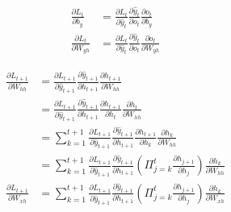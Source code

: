 \documentclass{beamer}
\begin{document}
\begin{frame}
    \begin{equation*}
        \begin{aligned}
            \frac{\partial L_t}{\partial b_y}
            &= \frac{\partial L_t}{\partial\hat{y}_t}\frac{\partial\hat{y}_t}{\partial o_t}\frac{\partial o_t}{\partial b_y} \\
            \frac{\partial L_t}{\partial W_{yh}}
            &= \frac{\partial L_t}{\partial\hat{y}_t}\frac{\partial\hat{y}_t}{\partial o_t}\frac{\partial o_t}{\partial W_{yh}}
        \end{aligned}
    \end{equation*}
\end{frame}

\begin{frame}
    \begin{equation*}
        \begin{aligned}
            \frac{\partial L_{t+1}}{\partial W_{hh}}
            &= \frac{\partial L_{t+1}}{\partial\hat{y}_{t+1}}\frac{\partial\hat{y}_{t+1}}{\partial h_{t+1}}\frac{\partial h_{t+1}}{\partial W_{hh}} \\
            &= \frac{\partial L_{t+1}}{\partial\hat{y}_{t+1}}\frac{\partial\hat{y}_{t+1}}{\partial h_{t+1}}\frac{\partial h_{t+1}}{\partial h_t}\frac{\partial h_t}{\partial W_{hh}} \\
            &= \sum_{k=1}^{t+1}\frac{\partial L_{t+1}}{\partial\hat{y}_{t+1}}\frac{\partial\hat{y}_{t+1}}{\partial h_{t+1}}\frac{\partial h_{t+1}}{\partial h_k}\frac{\partial h_k}{\partial W_{hh}} \\
            &= \sum_{k=1}^{t+1}\frac{\partial L_{t+1}}{\partial\hat{y}_{t+1}}\frac{\partial\hat{y}_{t+1}}{\partial h_{t+1}}\left(\Pi_{j=k}^t\frac{\partial h_{j+1}}{\partial h_j}\right)\frac{\partial h_k}{\partial W_{hh}} \\
            \frac{\partial L_{t+1}}{\partial W_{xh}}
            &= \sum_{k=1}^{t+1}\frac{\partial L_{t+1}}{\partial\hat{y}_{t+1}}\frac{\partial\hat{y}_{t+1}}{\partial h_{t+1}}\left(\Pi_{j=k}^t\frac{\partial h_{j+1}}{\partial h_j}\right)\frac{\partial h_k}{\partial W_{xh}} \\
        \end{aligned}
    \end{equation*}
\end{frame}
\end{document}
